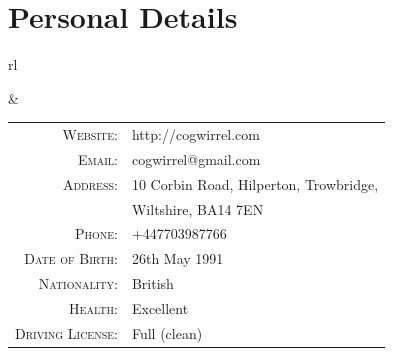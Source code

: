 \section*{Personal Details}

\begin{tabular}{rl}


&

\begin{tabular}{rl}
\textsc{Website:} & http://cogwirrel.com \\
\textsc{Email:} & cogwirrel@gmail.com \\
\textsc{Address:} & 10 Corbin Road, Hilperton, Trowbridge,\\
 & Wiltshire, BA14 7EN\\
\textsc{Phone:} & +447703987766\\
\textsc{Date of Birth:} & 26th May 1991 \\
\textsc{Nationality:} & British \\
\textsc{Health:} & Excellent \\
\textsc{Driving License:} & Full (clean)
\end{tabular}

\end{tabular}
